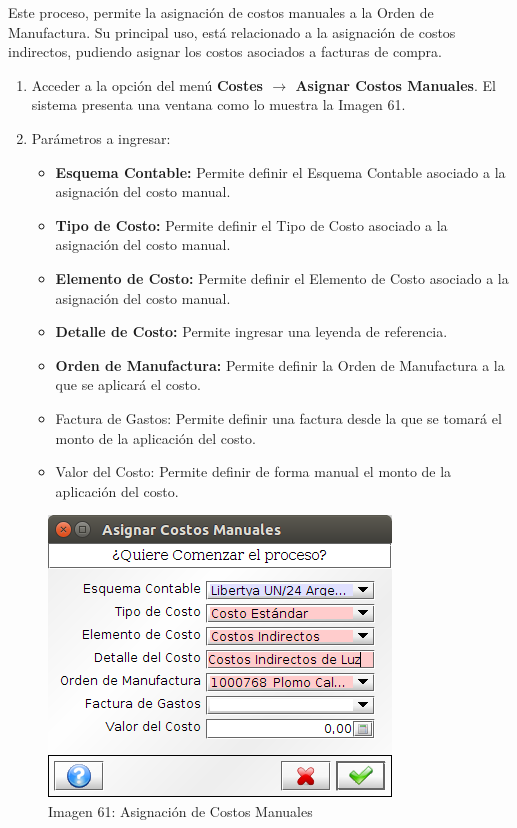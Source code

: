 \documentclass[letterpaper,10pt,spanish]{sphinxmanual}
\begin{document}
Este proceso, permite la asignación de costos manuales a la Orden de Manufactura. Su principal uso, está relacionado a la asignación de costos indirectos, pudiendo asignar los costos asociados a facturas de compra.
\begin{enumerate}
\item {} 
Acceder a la opción del menú \textbf{Costes \(\rightarrow\) Asignar Costos Manuales}. El sistema presenta una ventana como lo muestra la Imagen 61.

\item {} 
Parámetros a ingresar:
\begin{itemize}
\item {} 
\textbf{Esquema Contable:} Permite definir el Esquema Contable asociado a la asignación del costo manual.

\item {} 
\textbf{Tipo de Costo:} Permite definir el Tipo de Costo asociado a la asignación del costo manual.

\item {} 
\textbf{Elemento de Costo:} Permite definir el Elemento de Costo asociado a la asignación del costo manual.

\item {} 
\textbf{Detalle de Costo:} Permite ingresar una leyenda de referencia.

\item {} 
\textbf{Orden de Manufactura:} Permite definir la Orden de Manufactura a la que se aplicará el costo.

\item {} 
Factura de Gastos: Permite definir una factura desde la que se tomará el monto de la aplicación del costo.

\item {} 
Valor del Costo: Permite definir de forma manual el monto de la aplicación del costo.

\end{itemize}

\end{enumerate}
\begin{figure}[htbp]
\centering
\capstart

\includegraphics{ly_costemanual.png}
\caption{Imagen 61: Asignación de Costos Manuales}\end{figure}
\end{document}
